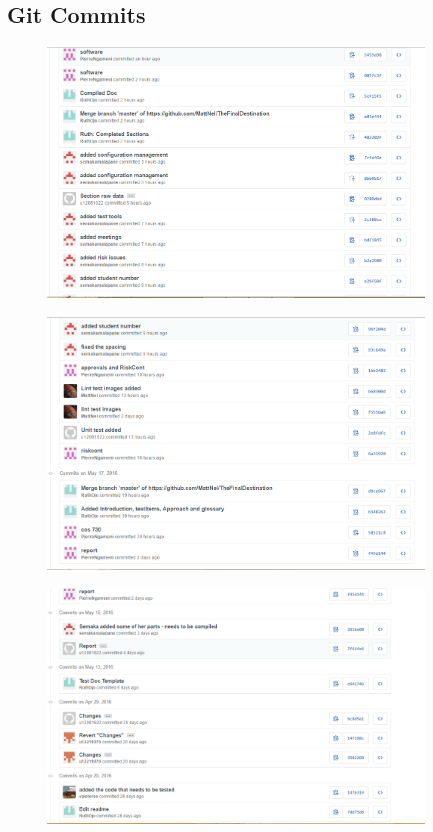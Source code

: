\subsection{Git Commits}


%

\begin{figure}[H]
  		\centering
      	\includegraphics[width=100mm]{gitThree}	      	
  		\caption{}
\end{figure}

\begin{figure}[H]
  		\centering
      	\includegraphics[width=100mm]{gitTwo}	      	
  		\caption{}
\end{figure}

\begin{figure}[H]
  		\centering
      	\includegraphics[width=100mm]{gitOne}	      	
  		\caption{}
\end{figure}

